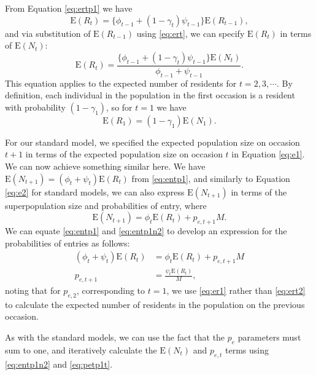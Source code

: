 \documentclass{article}
\newcommand{\E}[1]{\mathrm{E}(#1)}
\begin{document}
From Equation \eqref{eq:ertp1} we have
\begin{equation}
  \E{R_t} = \{ \phi_{t - 1} + (1 - \gamma_t) \psi_{t - 1}\} \E{R_{t - 1}}, \nonumber
\end{equation}
and via substitution of $\E{R_{t - 1}}$ using \eqref{eq:ert}, we can
specify $\E{R_t}$ in terms of $\E{N_t}$:
\begin{equation}
  \E{R_t} = \frac{\{ \phi_{t - 1} + (1 - \gamma_t) \psi_{t - 1}\}
    \E{N_t}}{\phi_{t - 1} + \psi_{t - 1}}. \label{eq:ert2}
\end{equation}
This equation applies to the expected number of residents for
$t = 2, 3, \cdots$. By definition, each individual in the population
in the first occasion is a resident with probability $(1 - \gamma_1)$,
so for $t = 1$ we have
\begin{equation}
\E{R_1} = (1 - \gamma_1) \E{N_1}. \label{eq:er1}
\end{equation}

For our standard model, we specified the expected population size on
occasion $t + 1$ in terms of the expected population size on occasion
$t$ in Equation \eqref{eq:e1}. We can now achieve something similar
here. We have $\E{N_{t + 1}} = (\phi_t + \psi_t) \E{R_t}$ from
\eqref{eq:entp1}, and similarly to Equation \eqref{eq:e2} for standard
models, we can also express $\E{N_{t + 1}}$ in terms of the
superpopulation size and probabilities of entry, where
\begin{equation}
  \E{N_{t + 1}} = \phi_t \E{R_t} + p_{e, t + 1}M.  \label{eq:entp1n2}
\end{equation}
We can equate \eqref{eq:entp1} and \eqref{eq:entp1n2} to develop an
expression for the probabilities of entries as follows:
\begin{align}
  (\phi_t + \psi_t) \E{R_t} &= \phi_t \E{R_t} + p_{e, t + 1}M \nonumber \\
  p_{e, t + 1} &= \frac{\psi_t \E{R_t}}{M}, \label{eq:petp1t}
\end{align}
noting that for $p_{e, 2}$, corresponding to $t = 1$, we use
\eqref{eq:er1} rather than \eqref{eq:ert2} to calculate the expected
number of residents in the population on the previous occasion.

As with the standard models, we can use the fact that the $p_e$
parameters must sum to one, and iteratively calculate the $\E{N_t}$
and $p_{e, t}$ terms using \eqref{eq:entp1n2} and \eqref{eq:petp1t}.

 
\end{document}
